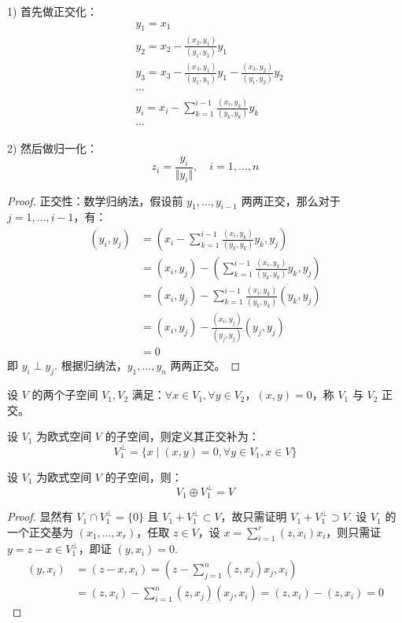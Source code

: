 1) 首先做正交化：
\begin{align*}
    &y_1=x_1\\
    &y_2=x_2-\frac{(x_2,y_1)}{(y_1,y_1)}y_1\\
    &y_3=x_3-\frac{(x_3,y_1)}{(y_1,y_1)}y_1-\frac{(x_3,y_2)}{(y_1,y_2)}y_2\\
    &\cdots\\
    &y_i=x_i-\sum_{k=1}^{i-1}\frac{(x_i,y_k)}{(y_k,y_k)}y_k\\
    &\cdots
\end{align*}

2) 然后做归一化：
\[
    z_i=\frac{y_i}{\Vert y_i\Vert},\quad i=1,\ldots,n
\]
\begin{proof}
正交性：数学归纳法，假设前 $y_1,\ldots,y_{i-1}$ 两两正交，那么对于 $j=1,\ldots,i-1$，有：
\begin{align*}
    (y_i,y_j)&=\left(x_i-\sum_{k=1}^{i-1}\frac{(x_i,y_k)}{(y_k,y_k)}y_k,y_j\right)\\
    &=(x_i,y_j)-\left(\sum_{k=1}^{i-1}\frac{(x_i,y_k)}{(y_k,y_k)}y_k,y_j\right)\\
    &=(x_i,y_j)-\sum_{k=1}^{i-1}\frac{(x_i,y_k)}{(y_k,y_k)}(y_k,y_j)\\
    &=(x_i,y_j)-\frac{(x_i,y_j)}{(y_j,y_j)}(y_j,y_j)\\
    &=0
\end{align*}
即 $y_i\perp y_j$. 根据归纳法，$y_1,\ldots,y_n$ 两两正交。
\end{proof}

\begin{definition}[子空间的正交性]
设 $V$ 的两个子空间 $V_1,V_2$ 满足：$\forall x\in V_1,\forall y\in V_2$，$(x,y)=0$，称 $V_1$ 与 $V_2$ 正交。
\end{definition}

\begin{definition}[正交补]
设 $V_1$ 为欧式空间 $V$ 的子空间，则定义其正交补为：
\[V_1^{\perp}=\{x\mid(x,y)=0,\forall y\in V_1,x\in V\}\]
\end{definition}

\begin{theorem}
\label{thm:v1+v1p}
设 $V_1$ 为欧式空间 $V$ 的子空间，则：
\[V_1\oplus V_1^{\perp}=V\]
\end{theorem}
\begin{proof}
显然有 $V_1\cap V_1^{\perp}=\{0\}$ 且 $V_1+V_1^{\perp}\subset V$，故只需证明 $V_1+V_1^{\perp}\supset V$.
设 $V_1$ 的一个正交基为 $(x_1,\ldots,x_r)$，任取 $z\in V$，设 $x=\sum_{i=1}^r(z,x_i)x_i$，则只需证 $y=z-x\in V_1^{\perp}$，即证 $(y,x_i)=0$.
\begin{align*}
    (y,x_i)&=(z-x,x_i)=\left(z-\sum_{j=1}^n(z,x_j)x_j,x_i\right)\\
    &=(z,x_i)-\sum_{i=1}^n(z,x_j)(x_j,x_i)=(z,x_i)-(z,x_i)=0
\end{align*}
\end{proof}

